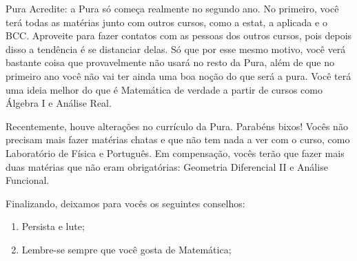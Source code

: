\begin{subsecao}{Pura}
Acredite: a Pura só começa realmente no segundo ano. No primeiro, você terá
todas as matérias junto com outros cursos, como a estat, a aplicada e o BCC.
Aproveite para fazer contatos com as pessoas dos outros cursos, pois depois
disso a tendência é se distanciar delas. Só que por esse mesmo motivo, você
verá bastante coisa que provavelmente não usará no resto da Pura, além de que
no primeiro ano você não vai ter ainda uma boa noção do que será a pura. Você
terá uma ideia melhor do que é Matemática de verdade a partir de cursos
como Álgebra I e Análise Real.


Recentemente, houve alterações no currículo da Pura. Parabéns bixos! Vocês não
precisam mais fazer matérias chatas e que não tem nada a ver com o curso, como
Laboratório de Física e Português. Em compensação, vocês terão que fazer mais
duas matérias que não eram obrigatórias: Geometria Diferencial II e Análise Funcional.

Finalizando, deixamos para vocês os seguintes conselhos:
\begin{enumerate}


\item	Persista e lute;
\item	Lembre-se sempre que você gosta de Matemática;


\end{enumerate}
\end{subsecao}

